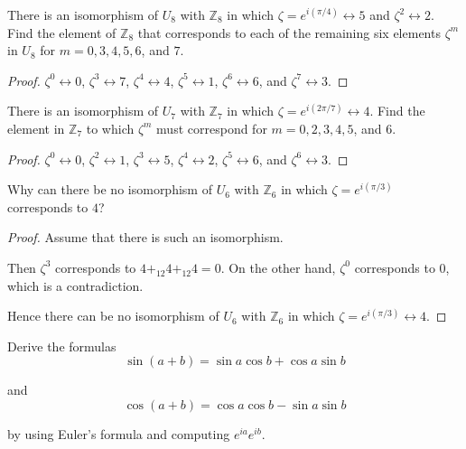 \begin{exercise}
    There is an isomorphism of $U_{8}$ with $\mathbb{Z}_{8}$ in which $\zeta = e^{i(\pi/4)}\leftrightarrow 5$ and $\zeta^{2}\leftrightarrow 2$. Find the element of $\mathbb{Z}_{8}$ that corresponds to each of the remaining six elements $\zeta^{m}$ in $U_{8}$ for $m = 0, 3, 4, 5, 6$, and $7$.
\end{exercise}

\begin{proof}
    $\zeta^{0} \leftrightarrow 0$, $\zeta^{3} \leftrightarrow 7$, $\zeta^{4} \leftrightarrow 4$, $\zeta^{5}\leftrightarrow 1$, $\zeta^{6}\leftrightarrow 6$, and $\zeta^{7}\leftrightarrow 3$.
\end{proof}

\begin{exercise}
    There is an isomorphism of $U_{7}$ with $\mathbb{Z}_{7}$ in which $\zeta = e^{i(2\pi/7)}\leftrightarrow 4$. Find the element in $\mathbb{Z}_{7}$ to which $\zeta^{m}$ must correspond for $m = 0, 2, 3, 4, 5$, and $6$.
\end{exercise}

\begin{proof}
    $\zeta^{0} \leftrightarrow 0$, $\zeta^{2} \leftrightarrow 1$, $\zeta^{3} \leftrightarrow 5$, $\zeta^{4} \leftrightarrow 2$, $\zeta^{5} \leftrightarrow 6$, and $\zeta^{6} \leftrightarrow 3$.
\end{proof}

\begin{exercise}
    Why can there be no isomorphism of $U_{6}$ with $\mathbb{Z}_{6}$ in which $\zeta = e^{i(\pi/3)}$ corresponds to $4$?
\end{exercise}

\begin{proof}
    Assume that there is such an isomorphism.

    Then $\zeta^{3}$ corresponds to $4 {+}_{12} 4 {+}_{12} 4 = 0$. On the other hand, $\zeta^{0}$ corresponds to $0$, which is a contradiction.

    Hence there can be no isomorphism of $U_{6}$ with $\mathbb{Z}_{6}$ in which $\zeta = e^{i(\pi/3)}\leftrightarrow 4$.
\end{proof}

\begin{exercise}
    Derive the formulas
    \[
        \sin(a + b) = \sin a\cos b + \cos a\sin b
    \]

    and
    \[
        \cos(a + b) = \cos a\cos b - \sin a\sin b
    \]

    by using Euler's formula and computing $e^{ia}e^{ib}$.
\end{exercise}


